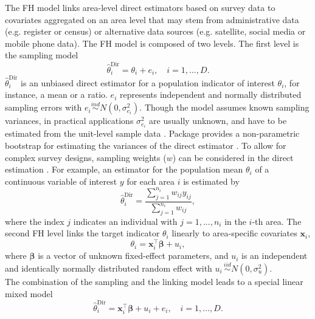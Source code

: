 The FH model links area-level direct estimators based on survey data to
covariates aggregated on an area level that may stem from administrative data
(e.g. register or census) or alternative data sources (e.g. satellite,
social media or mobile phone data). The FH model is composed of two levels. The
first level is the sampling model
%
\begin{equation*}
\hat{\theta}_{i}^{\text{Dir}}=\theta_{i} + e_{i}, \quad i=1,\ldots,D.
\end{equation*}
%
$\hat{\theta}_{i}^{\text{Dir}}$ is an unbiased direct estimator for a population
indicator of interest
$\theta_{i}$, for instance, a mean or a ratio. $e_{i}$ represents independent and
normally distributed
sampling errors with $e_{i} \stackrel{ind}{\sim} N\left(0,\sigma_{e_{i}}^2\right)$. Though the model assumes known sampling variances, in practical applications
$\sigma_{e_{i}}^2$ are usually unknown, and have to be estimated from the
unit-level sample data \citep{Rivest2003,Wang2003,You2006}. Package 
provides a non-parametric bootstrap for estimating the variances of the direct
estimator \citep{Alfons2013}. To allow for complex survey designs, sampling
weights ($w$) can be considered in the direct estimation \citep{Horvitz1952}.
For example, an estimator for the population mean $\theta_{i}$ of a continuous
variable of interest $y$ for each area $i$ is estimated by
%
\begin{equation*}
\hat{\theta}_{i}^{\text{Dir}} =
\frac{\sum_{j=1}^{n_i} w_{ij} y_{ij}}{\sum_{j=1}^{n_i} w_{ij}},
\end{equation*}
%
where the index $j$ indicates an individual with $j = 1, ..., n_i$ in the $i$-th
area. The second FH level links the target indicator $\theta_i$ linearly to
area-specific covariates $\boldsymbol{x}_i$,
%
\begin{equation*}
\theta_i = \boldsymbol{x}^{\top}_i \boldsymbol{\beta} +u_{i},
\end{equation*}
%
where $\boldsymbol{\beta}$ is a vector of unknown fixed-effect parameters, and $u_i$
is an independent and identically normally distributed random effect with
$u_{i} \, \stackrel{iid}{\sim} N\left(0,\sigma_{u}^2\right)$. \\
The combination of the sampling and the linking model leads to a special linear
mixed model
%
\begin{equation}
\hat{\theta}_{i}^{\text{Dir}}=\boldsymbol{x}^{\top}_i \boldsymbol{\beta} +u_{i}
+ e_{i},
\quad i=1,\ldots,D.
\label{eq:Combination}
\end{equation}
